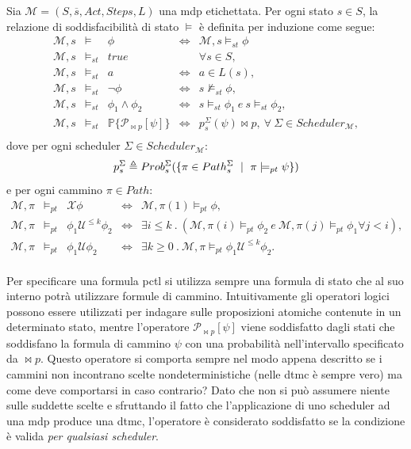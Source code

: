 \begin{mtdef}
	Sia $\mathcal{M} = (S,\overline{s},Act,Steps,L)$ una \ac{mdp} etichettata. Per ogni stato $s \in S$, la relazione di soddisfacibilità di stato $\models$ è definita per induzione come segue:
$$
	\begin{array}{rllcl}
		\mathcal{M},s &\models& \phi &\Leftrightarrow& \mathcal{M},s \models_{st} \phi \\
		\mathcal{M},s &\models_{st}& true && \forall s \in S, \\
		\mathcal{M},s &\models_{st}& \mathit{a} &\Leftrightarrow& \mathit{a} \in L(s), \\
		\mathcal{M},s &\models_{st}& \neg\phi &\Leftrightarrow& s \not\models_{st} \phi, \\
		\mathcal{M},s &\models_{st}& \phi_1 \wedge \phi_2 &\Leftrightarrow& s\models_{st}\phi_1 \ e\ s\models_{st}\phi_2, \\
		\mathcal{M},s &\models_{st}& \mathbb{P}\{ \mathcal{P}_{\bowtie p}[\psi]\} &\Leftrightarrow& p_s^\Sigma(\psi)\bowtie p,\ \forall\ \Sigma \in Scheduler_\mathcal{M}, \\
	\end{array}
$$
dove per ogni scheduler $\Sigma \in Scheduler_\mathcal{M}$:
$$
p_s^\Sigma \triangleq Prob_s^\Sigma(\{\pi \in Path_s^\Sigma \mbox{ }\mid\mbox{ } \pi \models_{pt} \psi\})
$$
e per ogni cammino $\pi \in Path$:
$$
\begin{array}{rclcl}
	\mathcal{M},\pi & \models_{pt} & \mathcal{X}\phi & \Leftrightarrow & \mathcal{M},\pi(1) \models_{pt} \phi, \\
	\mathcal{M},\pi & \models_{pt} & \phi_1 \mathcal{U}^{\leq k} \phi_2 & \Leftrightarrow & \exists i \leq k\ .\ (\mathcal{M},\pi(i) \models_{pt} \phi_2\ e\ \mathcal{M},\pi(j) \models_{pt} \phi_1 \forall j < i), \\
	\mathcal{M},\pi & \models_{pt} & \phi_1 \mathcal{U} \phi_2 & \Leftrightarrow & \exists k \geq 0\ .\ \mathcal{M},\pi \models_{pt} \phi_1 \mathcal{U}^{\leq k} \phi_2. \\
\end{array}
$$
\end{mtdef}

Per specificare una formula \ac{pctl} si utilizza sempre una formula di stato che al suo interno potrà utilizzare formule di cammino. Intuitivamente gli operatori logici possono essere utilizzati per indagare sulle proposizioni atomiche contenute in un determinato stato, mentre l'operatore $\mathcal{P}_{\bowtie p}[\psi]$ viene soddisfatto dagli stati che soddisfano la formula di cammino $\psi$ con una probabilità nell'intervallo specificato da $\bowtie p$. Questo operatore si comporta sempre nel modo appena descritto se i cammini non incontrano scelte nondeterministiche (nelle \ac{dtmc} è sempre vero) ma come deve comportarsi in caso contrario? Dato che non si può assumere niente sulle suddette scelte e sfruttando il fatto che l'applicazione di uno scheduler ad una \ac{mdp} produce una \ac{dtmc}, l'operatore è considerato soddisfatto se la condizione è valida \emph{per qualsiasi scheduler}.

